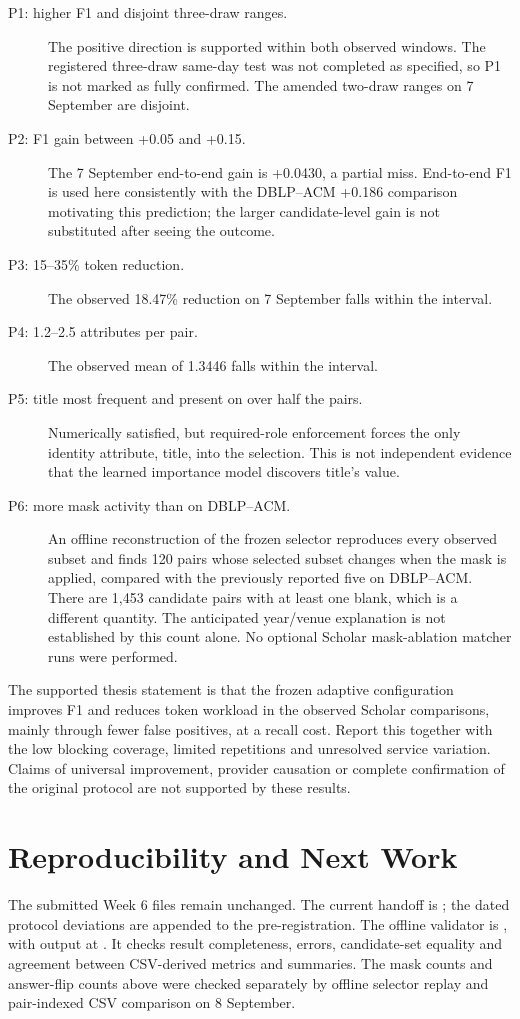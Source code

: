 \documentclass[11pt]{article}
\begin{document}
\begin{description}
\item[P1: higher F1 and disjoint three-draw ranges.]
The positive direction is supported within both observed windows. The registered
three-draw same-day test was not completed as specified, so P1 is not marked as
fully confirmed. The amended two-draw ranges on 7 September are disjoint.
\item[P2: F1 gain between +0.05 and +0.15.]
The 7 September end-to-end gain is +0.0430, a partial miss. End-to-end F1 is used
here consistently with the DBLP--ACM +0.186 comparison motivating this prediction;
the larger candidate-level gain is not substituted after seeing the outcome.
\item[P3: 15--35\% token reduction.]
The observed 18.47\% reduction on 7 September falls within the interval.
\item[P4: 1.2--2.5 attributes per pair.]
The observed mean of 1.3446 falls within the interval.
\item[P5: title most frequent and present on over half the pairs.]
Numerically satisfied, but required-role enforcement forces the only identity
attribute, title, into the selection. This is not independent evidence that
the learned importance model discovers title's value.
\item[P6: more mask activity than on DBLP--ACM.]
An offline reconstruction of the frozen selector reproduces every observed
subset and finds 120 pairs whose selected subset changes when the mask is applied,
compared with the previously reported five on DBLP--ACM. There are 1,453 candidate
pairs with at least one blank, which is a different quantity. The anticipated
year/venue explanation is not established by this count alone. No optional
Scholar mask-ablation matcher runs were performed.
\end{description}

The supported thesis statement is that the frozen adaptive configuration improves
F1 and reduces token workload in the observed Scholar comparisons, mainly through
fewer false positives, at a recall cost. Report this together with the low blocking
coverage, limited repetitions and unresolved service variation. Claims of universal
improvement, provider causation or complete confirmation of the original protocol
are not supported by these results.

\section{Reproducibility and Next Work}
The submitted Week 6 files remain unchanged. The current handoff is
; the dated protocol deviations are appended to the
pre-registration. The offline validator is
, with output at
. It checks result completeness, errors,
candidate-set equality and agreement between CSV-derived metrics and summaries.
The mask counts and answer-flip counts above were checked separately by offline
selector replay and pair-indexed CSV comparison on 8 September.
\end{document}
